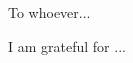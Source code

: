 \documentclass[12pt,american]{report}
\begin{document}
\copyrightfalse%
{}

\beforepreface%

\vfill
\begin{center}
To whoever...
\end{center}
\vfill

%
\vfill
\begin{center}
\indent I am grateful for ...
\end{center}
\vfill

\newcommand{\etc} {\emph{etc.\/}}
\newcommand{\etal}{\emph{et~al.\/}}
\newcommand{\eg}  {\emph{e.g.\/}}
\newcommand{\ie}  {\emph{i.e.\/}}
\end{document}
